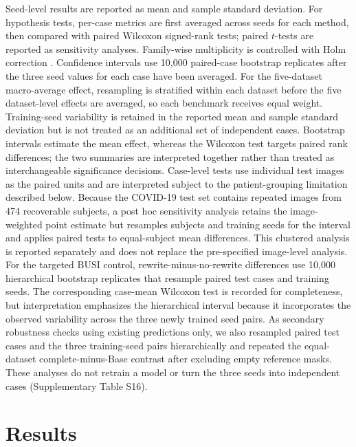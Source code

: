 Seed-level results are reported as mean and sample standard deviation. For
hypothesis tests, per-case metrics are first averaged across seeds for each
method, then compared with paired Wilcoxon signed-rank tests; paired $t$-tests are
reported as sensitivity analyses. Family-wise multiplicity is controlled with
Holm correction \cite{holm}. Confidence intervals use 10,000 paired-case
bootstrap replicates after the three seed values for each case have been
averaged. For the five-dataset macro-average effect, resampling is stratified within each
dataset before the five dataset-level effects are averaged, so each benchmark
receives equal weight. Training-seed variability is retained in the reported
mean and sample standard deviation but is not treated as an additional set of
independent cases. Bootstrap intervals estimate the mean effect, whereas the
Wilcoxon test targets paired rank differences; the two summaries are interpreted
together rather than treated as interchangeable significance decisions.
Case-level tests use individual test images as the paired units and are interpreted
subject to the patient-grouping limitation described below. Because the
COVID-19 test set contains repeated images from 474 recoverable subjects, a
post hoc sensitivity analysis retains the image-weighted point estimate but
resamples subjects and training seeds for the interval and applies paired tests
to equal-subject mean differences. This clustered analysis is reported
separately and does not replace the pre-specified image-level analysis.
For the targeted BUSI control, rewrite-minus-no-rewrite differences use 10,000
hierarchical bootstrap replicates that resample paired test cases and training
seeds. The corresponding case-mean Wilcoxon test is recorded for completeness,
but interpretation emphasizes the hierarchical interval because it incorporates
the observed variability across the three newly trained seed pairs.
As secondary robustness checks using existing predictions only, we also
resampled paired test cases and the three training-seed pairs hierarchically and
repeated the equal-dataset complete-minus-Base contrast after excluding empty
reference masks. These analyses do not retrain a model or turn the three seeds
into independent cases (Supplementary Table S16).

\section{Results}
\label{sec:results}

